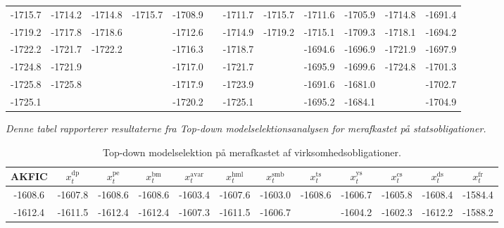 \documentclass[
  a4paper,
  oneside]{memoir}
\begin{document}
\begin{landscape}
\begin{table}[H]
\begin{threeparttable}
\begin{tabular}[t]{cccccccccccc}
-1715.7 & -1714.2 & -1714.8 & -1715.7 & -1708.9 &  & -1711.7 & -1715.7 & -1711.6 & -1705.9 & -1714.8 & -1691.4\\
 
\rowcolor{gray!6}  -1719.2 & -1717.8 & -1718.6 &  & -1712.6 &  & -1714.9 & -1719.2 & -1715.1 & -1709.3 & -1718.1 & -1694.2\\
 
-1722.2 & -1721.7 & -1722.2 &  & -1716.3 &  & -1718.7 &  & -1694.6 & -1696.9 & -1721.9 & -1697.9\\
 
\rowcolor{gray!6}  -1724.8 & -1721.9 &  &  & -1717.0 &  & -1721.7 &  & -1695.9 & -1699.6 & -1724.8 & -1701.3\\
 
-1725.8 & -1725.8 &  &  & -1717.9 &  & -1723.9 &  & -1691.6 & -1681.0 &  & -1702.7\\
 
\rowcolor{gray!6}  -1725.1 &  &  &  & -1720.2 &  & -1725.1 &  & -1695.2 & -1684.1 &  & -1704.9\\
\bottomrule
\end{tabular}
\begin{tablenotes}
\item \textit{Denne tabel rapporterer resultaterne fra \textit{Top-down} modelselektionsanalysen for merafkastet på statsobligationer.}
\end{tablenotes}
\end{threeparttable}
\end{table}

\begin{table}[H]

\caption{\label{tab:STEP-V-TABLE}Top-down modelselektion på merafkastet af virksomhedsobligationer.}
\centering
\begin{threeparttable}
\begin{tabular}[t]{cccccccccccc}
\toprule
AKFIC & $x_t^{\text{dp}}$ & $x_t^{\text{pe}}$ & $x_t^{\text{bm}}$ & $x_t^{\text{avar}}$ & $x_t^{\text{hml}}$ & $x_t^{\text{smb}}$ & $x_t^{\text{ts}}$ & $x_t^{\text{ys}}$ & $x_t^{\text{cs}}$ & $x_t^{\text{ds}}$ & $x_t^{\text{fr}}$\\
\midrule
\rowcolor{gray!6}  -1608.6 & -1607.8 & -1608.6 & -1608.6 & -1603.4 & -1607.6 & -1603.0 & -1608.6 & -1606.7 & -1605.8 & -1608.4 & -1584.4\\
 
-1612.4 & -1611.5 & -1612.4 & -1612.4 & -1607.3 & -1611.5 & -1606.7 &  & -1604.2 & -1602.3 & -1612.2 & -1588.2\\
 

\end{tabular}
\end{threeparttable}
\end{table}
\end{landscape}
\end{document}
